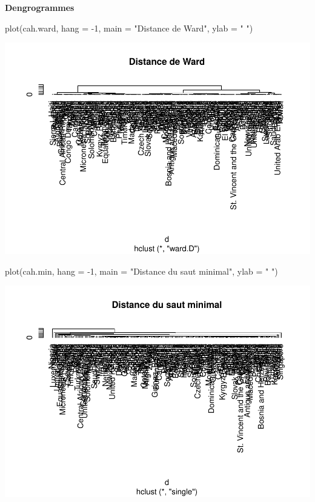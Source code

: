 \documentclass[
]{article}
\newenvironment{Shaded}{}{}
\newcommand{\AttributeTok}[1]{#1}
\newcommand{\DecValTok}[1]{#1}
\newcommand{\FunctionTok}[1]{#1}
\newcommand{\NormalTok}[1]{#1}
\newcommand{\SpecialCharTok}[1]{\textcolor[rgb]{0.00,0.50,0.50}{#1}}
\newcommand{\StringTok}[1]{\textcolor[rgb]{0.00,0.50,0.50}{#1}}
\begin{document}
\textbf{Dengrogrammes}

\begin{Shaded}
\begin{Highlighting}[]
\FunctionTok{plot}\NormalTok{(cah.ward, }\AttributeTok{hang =} \SpecialCharTok{{-}}\DecValTok{1}\NormalTok{, }\AttributeTok{main =} \StringTok{"Distance de Ward"}\NormalTok{, }\AttributeTok{ylab =} \StringTok{" "}\NormalTok{)}
\end{Highlighting}
\end{Shaded}

\includegraphics{Projet_files/figure-latex/unnamed-chunk-11-1.pdf}

\begin{Shaded}
\begin{Highlighting}[]
\FunctionTok{plot}\NormalTok{(cah.min, }\AttributeTok{hang =} \SpecialCharTok{{-}}\DecValTok{1}\NormalTok{, }\AttributeTok{main =} \StringTok{"Distance du saut minimal"}\NormalTok{, }\AttributeTok{ylab =} \StringTok{" "}\NormalTok{)}
\end{Highlighting}
\end{Shaded}

\includegraphics{Projet_files/figure-latex/unnamed-chunk-12-1.pdf}
\end{document}
